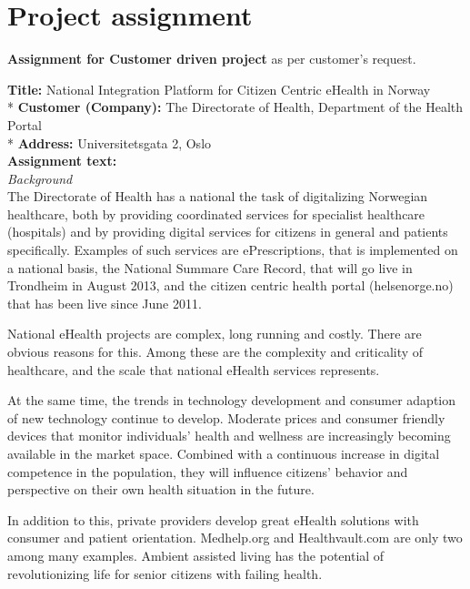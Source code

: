 
\chapter{Project assignment} 

\label{AppendixA}

\textbf{Assignment for Customer driven project}
as per customer's request.

\textbf{Title:} 	National Integration Platform for Citizen Centric eHealth in Norway \\*
\textbf{Customer (Company):} 	The Directorate of Health, Department of the Health Portal\\*
\textbf{Address:}			Universitetsgata 2, Oslo \\


\textbf{Assignment text:} \\
\textit{Background} \\
The Directorate of Health has a national the task of digitalizing Norwegian healthcare, both by providing coordinated services for specialist healthcare (hospitals) and by providing digital services for citizens in general and patients specifically. 
Examples of such services are ePrescriptions, that is implemented on a national basis, the National Summare Care Record, that will go live in Trondheim in August 2013, and the citizen centric health portal  (helsenorge.no) that has been live since June 2011.

National eHealth projects are complex, long running and costly. There are obvious reasons for this. 
Among these are the complexity and criticality of healthcare, and the scale that national eHealth services represents. 

At the same time, the trends in technology development and consumer adaption of new technology continue to develop. 
Moderate prices and consumer friendly devices that monitor individuals’ health and wellness are increasingly becoming available in the market space. 
Combined with a continuous increase in digital competence in the population, they will influence citizens’ behavior and perspective on their own health situation in the future.

In addition to this, private providers develop great eHealth solutions with consumer and patient orientation. Medhelp.org and Healthvault.com are only two among many examples. 
Ambient assisted living has the potential of revolutionizing life for senior citizens with failing health.

